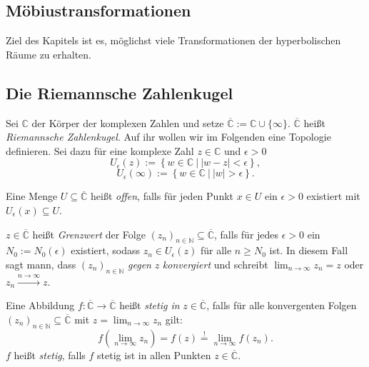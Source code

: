 \documentclass[11pt]{book}
\numberwithin{dummy}{section}
\theoremstyle{nonumberbreak}
\newenvironment{defin}[1][]{\ifthenelse{\equal{#1}{}}{\definition}{\definition[#1]}\rm}{\enddefinition}
\newcommand{\C}{\mathbb{C}}
\newcommand{\CC}{\overline{\mathbb{C}}}
\newcommand{\la}{\longrightarrow}
\begin{document}
\begin{spacing}{1.4}
\thispagestyle{empty}


\chapter{Möbiustransformationen} %
\setlength\abovedisplayshortskip{0pt}
\setlength\belowdisplayshortskip{10pt}
\setlength\abovedisplayskip{10pt}
\setlength\belowdisplayskip{10pt}

Ziel des Kapitels ist es, möglichst viele Transformationen der hyperbolischen Räume zu erhalten. 




\section{Die Riemannsche Zahlenkugel} %

\thispagestyle{empty}




\begin{defin}
\begin{compactenum}
\item Sei $\C$ der Körper der komplexen Zahlen und setze $\CC:= \C \cup \{\infty\}$. $\CC$ heißt \textit{Riemannsche Zahlenkugel}. Auf ihr wollen wir im Folgenden eine Topologie definieren. Sei dazu für eine komplexe Zahl $z \in \C$ und $\epsilon >0$ 
$$U_{\epsilon}(z) := \left\{ w \in \C \ \vert \ \vert w-z \vert < \epsilon \right\},$$
$$U_{\epsilon}(\infty) := \left\{ w \in \C \ \vert \ \vert w \vert > \epsilon \right\}.$$
\item Eine Menge $U \subseteq \CC$ heißt \textit{offen}, falls für jeden Punkt $x \in U$ ein $\epsilon >0$ existiert mit $U_{\epsilon}(x) \subseteq U$.
\item $z \in \CC$ heißt \textit{Grenzwert} der Folge $(z_n)_{n \in \mathbb{N}} \subseteq \CC$, falls für jedes $\epsilon >0$ ein $N_0 := N_0(\epsilon)$ existiert, sodass $z_n \in U_{\epsilon}(z)$ für alle $n \geqslant N_0$ ist. In diesem Fall sagt mann, dass $(z_n)_{n \in \mathbb{N}}$ \textit{gegen} $z$ \textit{konvergiert} und schreibt $\lim_{n\to \infty} z_n = z$ oder $z_n \xrightarrow{n \to \infty}z$.
\item Eine Abbildung $f: \CC \la \CC$ heißt \textit{stetig in} $z \in \CC$, falls für alle konvergenten Folgen $(z_n)_{n \in \mathbb{N}} \subseteq \CC$ mit $z=\lim_{n \to \infty} z_n$ gilt:
$$f\left( \lim_{n \to \infty} z_n\right) = f(z) \overset{!}{=} \lim_{n \to \infty} f(z_n).$$
$f$ heißt \textit{stetig}, falls $f$ stetig ist in allen Punkten $z \in \CC$.


\end{compactenum}
\end{defin}
\end{spacing}
\end{document}
